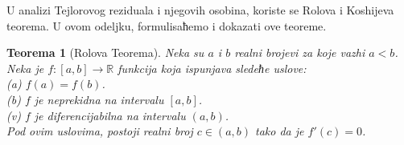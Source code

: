 \documentclass[12pt,a4paper]{article}
\newtheorem{thm}{Teorema}%
\begin{document}
 U analizi Tejlorovog reziduala i njegovih osobina, 
 koriste se Rolova i Koshijeva teorema. 
 U ovom odeljku, formulisaћemo i dokazati ove 
 teoreme. 
 
 \begin{thm}[Rolova Teorema]\label{thm1}
 Neka su $a$ i $b$ realni brojevi za koje vazhi $a<b$. 
 Neka je $f:[a,b]\rightarrow\mathbb{R}$ funkcija 
 koja ispunjava sledeћe uslove: 
 \\
 (a) $f(a)=f(b)$. 
 \\
 (b) $f$ je neprekidna na intervalu $[a,b]$.
 \\
 (v) $f$ je diferencijabilna na intervalu 
 $(a,b)$. 
 \\
 Pod ovim uslovima, 
 postoji realni broj $c\in(a,b)$ tako da je $f'(c)=0$. 
 \end{thm}
 
\end{document}
